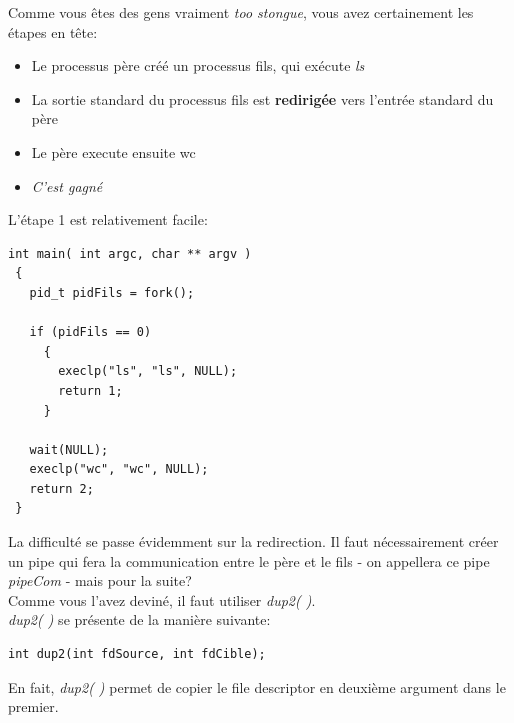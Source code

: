 \documentclass{report}
\begin{document}
Comme vous êtes des gens vraiment \emph{too stongue}, vous avez certainement les étapes en tête:
\begin{itemize}
\item{Le processus père créé un processus fils, qui exécute \emph{ls}}
\item{La sortie standard du processus fils est \textbf{redirigée} vers l'entrée standard du père}
\item{Le père execute ensuite wc}
\item{\textit{C'est gagné}}
\end{itemize}

L'étape 1 est relativement facile:
\begin{lstlisting}
int main( int argc, char ** argv )
 {
   pid_t pidFils = fork();

   if (pidFils == 0)
     {
       execlp("ls", "ls", NULL);
       return 1;
     }

   wait(NULL);
   execlp("wc", "wc", NULL);
   return 2;
 }
\end{lstlisting}

La difficulté se passe évidemment sur la redirection. Il faut nécessairement créer un pipe qui fera la communication entre le père et le fils - on appellera ce pipe \emph{pipeCom} - mais pour la suite?\\
Comme vous l'avez deviné, il faut utiliser \emph{dup2( )}.\\
\emph{dup2( )} se présente de la manière suivante:
\begin{verbatim}
int dup2(int fdSource, int fdCible);
\end{verbatim}
En fait, \emph{dup2( )} permet de copier le file descriptor en deuxième argument dans le premier.
\end{document}
